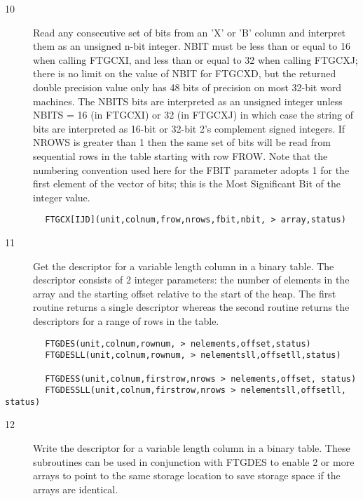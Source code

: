 \documentclass[11pt]{book}
\begin{document}
\begin{description}
\item[10] Read any consecutive set of bits from an 'X' or 'B' column and
    interpret them as an unsigned n-bit integer. NBIT must be less than
    or equal to 16 when calling FTGCXI, and less than or equal to 32 when
    calling FTGCXJ; there is no limit on the value of NBIT for FTGCXD, but
    the returned double precision value only has 48 bits of precision on
    most 32-bit word machines.  The NBITS bits are interpreted as an
    unsigned integer unless NBITS = 16 (in FTGCXI) or 32 (in FTGCXJ) in which
    case the string of bits are interpreted as 16-bit or 32-bit 2's
    complement signed integers.  If NROWS is greater than 1 then the
    same set of bits will be read from sequential rows in the table
    starting with row FROW.  Note that the numbering convention
    used here for the FBIT parameter adopts 1 for the first element of the
   vector of bits;  this is the Most Significant Bit of the integer value.
\end{description}

\begin{verbatim}
        FTGCX[IJD](unit,colnum,frow,nrows,fbit,nbit, > array,status)
\end{verbatim}

\begin{description}
\item[11] Get the descriptor for a variable length column in a binary table.
    The descriptor consists of 2 integer parameters: the number of elements
    in the array and the starting offset relative to the start of the heap.
    The first routine returns a single descriptor whereas the second routine
   returns the descriptors for a range of rows in the table.
\end{description}

\begin{verbatim}
        FTGDES(unit,colnum,rownum, > nelements,offset,status)
        FTGDESLL(unit,colnum,rownum, > nelementsll,offsetll,status)

        FTGDESS(unit,colnum,firstrow,nrows > nelements,offset, status)
        FTGDESSLL(unit,colnum,firstrow,nrows > nelementsll,offsetll, status)
\end{verbatim}

\begin{description}
\item[12]  Write the descriptor for a variable length column in a binary table.
    These subroutines can be used in conjunction with FTGDES to enable
    2 or more arrays to point to the same storage location to save
   storage space if the arrays are identical.
\end{description}
\end{document}
